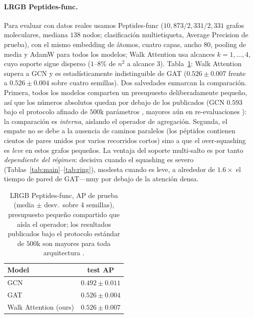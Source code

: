 \documentclass[runningheads]{llncs}
\begin{document}
\paragraph{LRGB Peptides-func.}
Para evaluar con datos reales usamos Peptides-func \cite{dwivedi2022lrgb}
($10{,}873/2{,}331/2{,}331$ grafos moleculares, mediana $138$ nodos;
clasificación multietiqueta, Average Precision de prueba), con el mismo
embedding de átomos, cuatro capas, ancho $80$, pooling de media y AdamW para
todos los modelos; Walk Attention usa alcances $k=1,\dots,4$, cuyo soporte
sigue disperso ($1$--$8\%$ de $n^2$ a alcance $3$). Tabla~\ref{tab:lrgb}: Walk
Attention supera a GCN y es estadísticamente indistinguible de GAT
($0.526\pm0.007$ frente a $0.526\pm0.004$ sobre cuatro semillas). Dos
salvedades enmarcan la comparación. Primera, todos los modelos comparten un
presupuesto deliberadamente pequeño, así que los números absolutos quedan por
debajo de los publicados (GCN $0.593$ bajo el protocolo afinado de $500$k
parámetros \cite{dwivedi2022lrgb}, mayores aún en re-evaluaciones
\cite{tonshoff2023where}): la comparación es \emph{interna}, aislando el
operador de agregación. Segunda, el empate no se debe a la ausencia de caminos
paralelos (los péptidos contienen cientos de pares unidos por varios recorridos
cortos) sino a que el over-squashing es \emph{leve} en estos grafos pequeños.
La ventaja del soporte multi-salto es por tanto \emph{dependiente del régimen}:
decisiva cuando el squashing es severo
(Tablas~\ref{tab:main}--\ref{tab:ring}), modesta cuando es leve, a alrededor de
$1.6\times$ el tiempo de pared de GAT---muy por debajo de la atención densa.

\begin{table}[t]
\centering
\caption{LRGB Peptides-func, AP de prueba (media $\pm$ desv.\ sobre 4
semillas), presupuesto pequeño compartido que aísla el operador; los resultados
publicados bajo el protocolo estándar de $500$k son mayores para toda
arquitectura \cite{dwivedi2022lrgb,tonshoff2023where}.}
\label{tab:lrgb}
\begin{tabular}{lc}
\toprule
\textbf{Model} & \textbf{test AP} \\
\midrule
GCN                          & $0.492\pm0.011$ \\
GAT                          & $0.526\pm0.004$ \\
Walk Attention (ours)        & $0.526\pm0.007$ \\
\bottomrule
\end{tabular}
\end{table}
\end{document}
